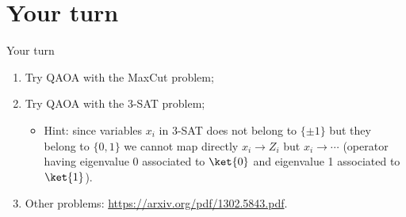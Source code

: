 \section{Your turn}
\SectionPage{}

\begin{frame}{Your turn}
\begin{enumerate}
    \item Try QAOA with the MaxCut problem;
    \item Try QAOA with the 3-SAT problem;
    \begin{itemize}
        \item \alert{Hint}: since variables \(x_i\) in 3-SAT does not belong to \(\{\pm 1\}\) but they belong to \(\{0, 1\}\) we cannot map directly \(x_i \to Z_i\) but \(x_i \to \cdots\) (operator having eigenvalue 0 associated to \(\ket{0}\) and eigenvalue 1 associated to \(\ket{1}\)). 
    \end{itemize}
    \item Other problems: \url{https://arxiv.org/pdf/1302.5843.pdf}.
\end{enumerate}
\end{frame}